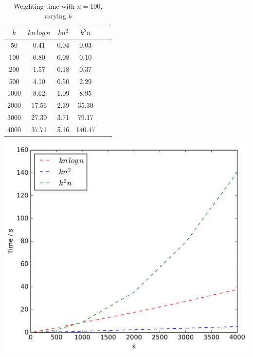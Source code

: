 \documentclass{article}
\begin{document}
    \begin{table}[!ht]
        \captionsetup{font=footnotesize,justification=justified,margin=0cm}
        \small
        \begin{minipage}{0.48\textwidth}
            \centering
            \caption{Weighting time with $n = 100$, varying $k$}
            \label{tab:weightk2}
            \begin{tabular}{c||ccccc}
                $k$ & $kn\,log\,n$ & $kn^2$ & $k^2n$\\
                \hline\hline
                50 & 0.41 & 0.04 & 0.03\\
                100 & 0.80 & 0.08 & 0.10\\
                200 & 1.57 & 0.18 & 0.37\\
                500 & 4.10 & 0.50 & 2.29\\
                1000 & 8.62 & 1.09 & 8.95\\
                2000 & 17.56 & 2.39 & 35.30\\
                3000 & 27.30 & 3.71 & 79.17\\
                4000 & 37.71 & 5.16 & 140.47\\
            \end{tabular}
            \includegraphics[scale=0.4]{varyingk2_weighting}
            \vspace{0.5cm}
        \end{minipage}\hfill
        \begin{minipage}{0.48\textwidth}

\end{minipage}
\end{table}
\end{document}
